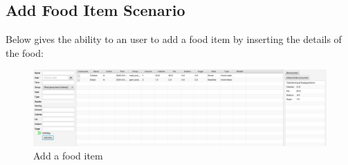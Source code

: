 \documentclass{scrreprt}
\begin{document}
\subsection{Add Food Item Scenario}

Below gives the ability to an user to add a food item by inserting the details of the food:

\begin{figure}[!htbp]
\centering
\includegraphics[width=15cm]{pictures/add-food-item.png}
\caption*{Add a food item}
\end{figure}

\FloatBarrier
\end{document}
